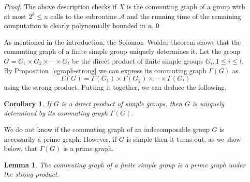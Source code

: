 \documentclass{elsarticle}
\newtheorem{cor}[theorem]{Corollary}
\newtheorem{lemma}[theorem]{Lemma}
\begin{document}
\begin{proof}
The above description checks if $X$ is the commuting graph of a group
with at most $2^k\le n$ calls to the subroutine $\mathcal{A}$ and the
running time of the remaining computation is clearly polynomially
bounded in $n$.\qed
\end{proof}


As mentioned in the introduction, the Solomon--Woldar theorem
\cite{SW13} shows that the commuting graph of a finite simple group
uniquely determines it. Let the group
$G=G_1\times G_2\times\cdots \times G_t$ be the direct product of
finite simple groups $G_i, 1\le i\le t$. By
Proposition~\ref{cgraph-strong} we can express its commuting graph
$\Gamma(G)$ as
\[
\Gamma(G)= \Gamma(G_1)\times \Gamma(G_2)\times\cdots \times
\Gamma(G_t)
\]
using the strong product. Putting it together, we can deduce the
following.


\begin{cor}
  If $G$ is a direct product of simple groups, then $G$ is uniquely
  determined by its commuting graph $\Gamma(G)$.
\end{cor}

We do not know if the commuting graph of an indecomposable group $G$
is necessarily a prime graph. However, if $G$ is simple then it turns
out, as we show below, that $\Gamma(G)$ is a prime graph.

\begin{lemma}\label{simple-prime-lem}
The commuting graph of a finite simple group is a prime graph under the
strong product.
\end{lemma}
\end{document}
